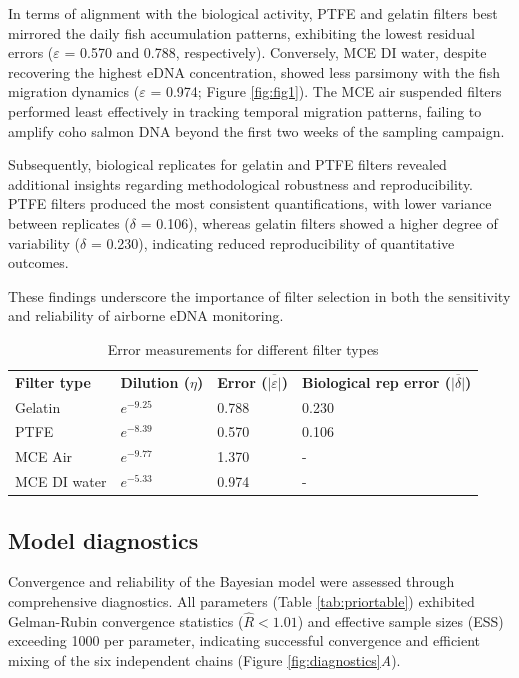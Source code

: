\documentclass{article}
\begin{document}
In terms of alignment with the biological activity, PTFE and gelatin filters best mirrored the daily fish accumulation patterns, exhibiting the lowest residual errors ($\varepsilon$ = 0.570 and 0.788, respectively).  Conversely, MCE DI water, despite recovering the highest eDNA concentration, showed less parsimony with the fish migration dynamics ($\varepsilon$ = 0.974; Figure \ref{fig:fig1}). The MCE air suspended filters performed least effectively in tracking temporal migration patterns, failing to amplify coho salmon DNA beyond the first two weeks of the sampling campaign.

Subsequently, biological replicates for gelatin and PTFE filters revealed additional insights regarding methodological robustness and reproducibility. PTFE filters produced the most consistent quantifications, with lower variance between replicates ($\delta$ = 0.106), whereas gelatin filters showed a higher degree of variability ($\delta$ = 0.230), indicating reduced reproducibility of quantitative outcomes. 

These findings underscore the importance of filter selection in both the sensitivity and reliability of airborne eDNA monitoring.

\begin{table}[h!]
\centering
\caption{Error measurements for different filter types}
\label{tab:filter_error}

\begin{tabular}{llll}
\textbf{Filter type} & \textbf{Dilution ($\eta$)} & \textbf{Error ($\overline{|\varepsilon|}$)} & \textbf{Biological rep error ($\overline{|\delta|}$)} \\
Gelatin & $e^{-9.25}$ & 0.788 & 0.230 \\
PTFE & $e^{-8.39}$ & 0.570 & 0.106 \\
MCE Air & $e^{-9.77}$ & 1.370 & - \\
MCE DI water & $e^{-5.33}$ & 0.974 & - \\
\end{tabular}
\end{table}


\subsection{Model diagnostics}

Convergence and reliability of the Bayesian model were assessed through comprehensive diagnostics. All parameters (Table \ref{tab:priortable}) exhibited Gelman-Rubin convergence statistics ($\hat{R} < 1.01$) and effective
sample sizes (ESS) exceeding 1000 per parameter, indicating successful convergence and efficient mixing of
the six independent chains (Figure \ref{fig:diagnostics}\textit{A}). 
\end{document}

